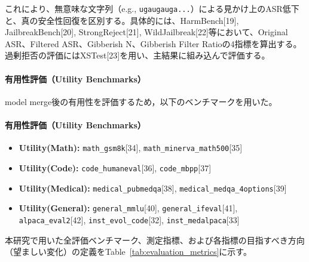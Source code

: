 \documentclass{article}
\begin{document}
これにより、無意味な文字列（e.g., \texttt{ugaugauga...}）による見かけ上のASR低下と、真の安全性回復を区別する。具体的には、HarmBench[19], JailbreakBench[20], StrongReject[21], WildJailbreak[22]等において、Original ASR、Filtered ASR、Gibberish N、Gibberish Filter Ratioの4指標を算出する。過剰拒否の評価にはXSTest[23]を用い、主結果に組み込んで評価する。
\paragraph{有用性評価（Utility Benchmarks）}
model merge後の有用性を評価するため，以下のベンチマークを用いた。
\paragraph{有用性評価（Utility Benchmarks）}

\begin{itemize}
    \item \textbf{Utility(Math):}
    \texttt{math\_gsm8k}[34],
    \texttt{math\_minerva\_math500}[35]

    \item \textbf{Utility(Code):}
    \texttt{code\_humaneval}[36],
    \texttt{code\_mbpp}[37]

    \item \textbf{Utility(Medical):}
    \texttt{medical\_pubmedqa}[38],
    \texttt{medical\_medqa\_4options}[39]

    \item \textbf{Utility(General):}
    \texttt{general\_mmlu}[40],
    \texttt{general\_ifeval}[41],
    \texttt{alpaca\_eval2}[42],
    \texttt{inst\_evol\_code}[32],
    \texttt{inst\_medalpaca}[33]
\end{itemize}

本研究で用いた全評価ベンチマーク、測定指標、および各指標の目指すべき方向（望ましい変化）の定義をTable~\ref{tab:evaluation_metrics}に示す。
\end{document}
